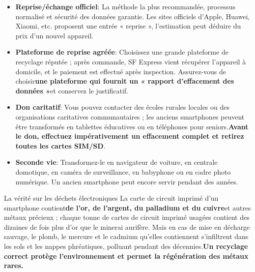 \begin{itemize}
  \item \textbf{Reprise/échange officiel}: La méthode la plus recommandée, processus normalisé et sécurité des données garantie. Les sites officiels d'Apple, Huawei, Xiaomi, etc. proposent une entrée « reprise », l'estimation peut déduire du prix d'un nouvel appareil.
  \item \textbf{Plateforme de reprise agréée}: Choisissez une grande plateforme de recyclage réputée ; après commande, SF Express vient récupérer l'appareil à domicile, et le paiement est effectué après inspection. Assurez-vous de choisir\textbf{une plateforme qui fournit un « rapport d'effacement des données »}et conservez le justificatif.
  \item \textbf{Don caritatif}: Vous pouvez contacter des écoles rurales locales ou des organisations caritatives communautaires ; les anciens smartphones peuvent être transformés en tablettes éducatives ou en téléphones pour seniors.\textbf{Avant le don, effectuez impérativement un effacement complet et retirez toutes les cartes SIM/SD}.
  \item \textbf{Seconde vie}: Transformez-le en navigateur de voiture, en centrale domotique, en caméra de surveillance, en babyphone ou en cadre photo numérique. Un ancien smartphone peut encore servir pendant des années.
\end{itemize}

\begin{tcbinfo}{La vérité sur les déchets électroniques}
La carte de circuit imprimé d'un smartphone contient\textbf{de l'or, de l'argent, du palladium et du cuivre}et autres métaux précieux ; chaque tonne de cartes de circuit imprimé usagées contient des dizaines de fois plus d'or que le minerai aurifère. Mais en cas de mise en décharge sauvage, le plomb, le mercure et le cadmium qu'elles contiennent s'infiltrent dans les sols et les nappes phréatiques, polluant pendant des décennies.\textbf{Un recyclage correct protège l'environnement et permet la régénération des métaux rares.}

\end{tcbinfo}

